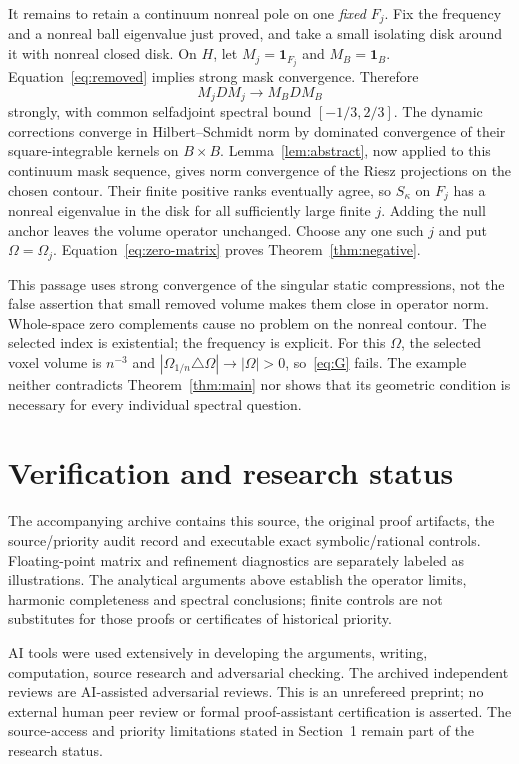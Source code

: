 \documentclass[11pt]{article}
\theoremstyle{remark}\newtheorem{remark}[theorem]{Remark}
\begin{document}
It remains to retain a continuum nonreal pole on one \emph{fixed} $F_j$. Fix the frequency and a nonreal ball eigenvalue just proved, and take a small isolating disk around it with nonreal closed disk. On $H$, let $M_j=\mathbf1_{F_j}$ and $M_B=\mathbf1_B$. Equation~\eqref{eq:removed} implies strong mask convergence. Therefore
\[
 M_jDM_j\longrightarrow M_BDM_B
\]
strongly, with common selfadjoint spectral bound $[-1/3,2/3]$. The dynamic corrections converge in Hilbert--Schmidt norm by dominated convergence of their square-integrable kernels on $B\times B$. Lemma~\ref{lem:abstract}, now applied to this continuum mask sequence, gives norm convergence of the Riesz projections on the chosen contour. Their finite positive ranks eventually agree, so $S_\kappa$ on $F_j$ has a nonreal eigenvalue in the disk for all sufficiently large finite $j$. Adding the null anchor leaves the volume operator unchanged. Choose any one such $j$ and put $\Omega=\Omega_j$. Equation~\eqref{eq:zero-matrix} proves Theorem~\ref{thm:negative}.

This passage uses strong convergence of the singular static compressions, not the false assertion that small removed volume makes them close in operator norm. Whole-space zero complements cause no problem on the nonreal contour. The selected index is existential; the frequency is explicit. For this $\Omega$, the selected voxel volume is $n^{-3}$ and $|\Omega_{1/n}\triangle\Omega|\to|\Omega|>0$, so~\eqref{eq:G} fails. The example neither contradicts Theorem~\ref{thm:main} nor shows that its geometric condition is necessary for every individual spectral question.

\section{Verification and research status}

The accompanying archive contains this source, the original proof artifacts, the source/priority audit record and executable exact symbolic/rational controls. Floating-point matrix and refinement diagnostics are separately labeled as illustrations. The analytical arguments above establish the operator limits, harmonic completeness and spectral conclusions; finite controls are not substitutes for those proofs or certificates of historical priority.

AI tools were used extensively in developing the arguments, writing, computation, source research and adversarial checking. The archived independent reviews are AI-assisted adversarial reviews. This is an unrefereed preprint; no external human peer review or formal proof-assistant certification is asserted. The source-access and priority limitations stated in Section~1 remain part of the research status.
\end{document}
